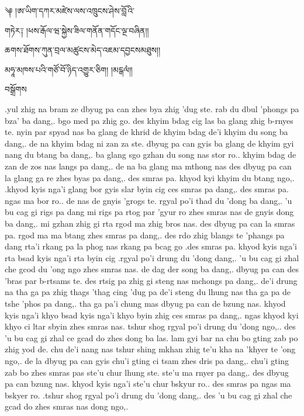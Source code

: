 \documentclass{article}
\begin{document}
\bgroup
\LARGE
\noindent༆ །ཨ་ཡིག་དཀར་མཛེས་ལས་འཁྲུངས་ཤེས་བློ  འི་\par
གཏེར༑ །ཕས་རྒོལ་ཝ་སྐྱེས་ཟིལ་གནོན་གདོང་ལྔ་བཞིན།།\par
ཆགས་ཐོགས་ཀུན་བྲལ་མཚུངས་མེད་འཇམ་དབྱངསམཐུས།།\par
མཧཱ་མཁས་པའི་གཙོ་བོ་ཉིད་འགྱུར་ཅིག། །མངྒལཾ༎\par
བསྒྲོགས
\egroup

\tib	.yul zhig na bram ze dbyug pa can zhes bya zhig 'dug ste.
	rab du dbul 'phongs pa bza' ba dang,. bgo med pa zhig go.
	des khyim bdag cig las ba glang zhig b-rnyes te. nyin par
	spyad nas ba glang de khrid de khyim bdag de'i khyim du song
	ba dang,. de na khyim bdag ni zan za ste. dbyug pa can gyis ba
	glang de khyim gyi nang du btang ba dang,. ba glang sgo gzhan
	du song nas stor ro..  khyim bdag de zan de zos nas langs pa
	dang,. de na ba glang ma mthong nas des dbyug pa can la glang
	ga re zhes byas pa dang,. des smras pa. khyod kyi khyim du btang
	ngo,. .khyod kyis nga'i glang bor gyis slar byin cig ces smras
	pa dang,. des smras pa. ngas ma bor ro..  de nas de gnyis 'grogs
	te. rgyal po'i thad du 'dong ba dang,. 'u bu cag gi rigs pa dang
	mi rigs pa rtog par 'gyur ro zhes smras nas de gnyis dong ba
	dang,. mi gzhan zhig gi rta rgod ma zhig bros nas. des dbyug pa
	can la smras pa. rgod ma ma btang zhes smras pa dang,. des rdo
	zhig blangs te 'phangs pa dang rta'i rkang pa la phog nas rkang
	pa bcag go .des smras
	pa. khyod kyis nga'i rta bsad kyis nga'i rta byin cig
	.rgyal po'i drung du 'dong dang,. 'u bu cag gi zhal che gcod du
	'ong ngo zhes smras nas. de dag der song ba dang,. dbyug pa can
	des 'bras par b-rtsams te. des rtsig pa zhig gi steng nas mchongs
	pa dang,. de'i drung na tha ga pa zhig thags 'thag cing 'dug pa
	de'i steng du lhung nas tha ga pa de tshe 'phos pa dang,. tha ga
	pa'i chung mas dbyug pa can de bzung nas. khyod kyis nga'i khyo
	bsad kyis nga'i khyo byin zhig ces smras pa dang,. ngas khyod kyi
	khyo ci ltar sbyin zhes smras nas. tshur shog rgyal po'i drung du
	'dong ngo,.. des 'u bu cag gi zhal ce gcad do zhes dong ba las.
	lam gyi bar na chu bo gting zab po zhig yod de. chu de'i nang
	nas tshur shing mkhan zhig te'u kha na 'khyer te 'ong ngo,. de la
	dbyug pa can gyis chu'i gting ci tsam zhes dris pa dang,. chu'i
	gting zab bo zhes smras pas ste'u chur lhung ste. ste'u ma rnyer
	pa dang,. des dbyug pa can bzung nas. khyod kyis nga'i ste'u
	chur bskyur ro.. des smras pa ngas ma bskyer ro.  .tshur shog
	rgyal po'i drung du 'dong dang,. des 'u bu cag gi zhal che gcad
	do zhes smras nas dong ngo,.
\end{document}
